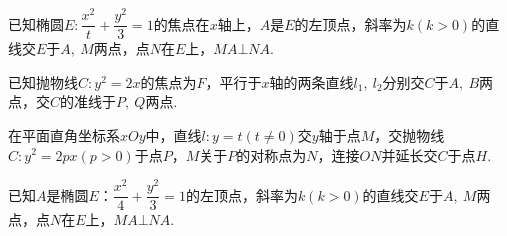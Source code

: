 \documentclass{BHCexam}
\begin{document}
\begin{questions}
\qs 已知椭圆$ E:\dfrac{x^2}{t}+\dfrac{y^2}{3}=1 $的焦点在$x$轴上，$ A $是$ E $的左顶点，斜率为$ k\left(k>0\right) $的直线交$ E $于$ A,~M $两点，点$ N $在$ E $上，$ MA\bot NA .$
\qs 已知抛物线$ C:y^2=2x $的焦点为$ F $，平行于$x$轴的两条直线$ l_1,~l_2 $分别交$ C $于$ A,~B $两点，交$ C $的准线于$P,~Q  $两点.
\qs 在平面直角坐标系$xOy$中，直线$ l:y=t\left(t\ne0\right) $交$y$轴于点$ M $，交抛物线$ C:  y^2=2px\left(p>0\right) $于点$ P $，$ M $关于$ P $的对称点为$ N $，连接$ ON $并延长交$ C $于点$ H $.
\qs 已知$ A $是椭圆$E$：$\dfrac{x^2}{4}+\dfrac{y^2}3=1$的左顶点，斜率为$ k\left(k>0\right) $的直线交$ E $于$ A,~M $两点，点$ N $在$ E $上，$ MA\bot NA $.
\begin{parts}

\end{parts}
\end{questions}
\end{document}
